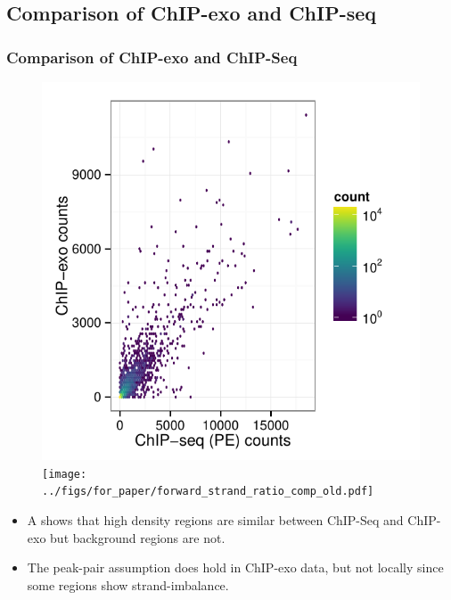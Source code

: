 \documentclass[compress,table,xcolor=dvipsnames]{beamer}\usepackage[]{graphicx}\usepackage[]{color}
\begin{document}
\subsection{Comparison of ChIP-exo and ChIP-seq}


\begin{frame}
  \frametitle{Comparison of ChIP-exo and ChIP-Seq}

\begin{figure}[H]
  \centering
  \includegraphics[width = .5\textwidth,page = 3 ]{../figs/for_paper/ChIPseqPET_ChIPexo_tagCount_comparison.pdf}
  \texttt{[image: ../figs/for\_paper/forward\_strand\_ratio\_comp\_old.pdf]}
\end{figure}

{\small
\begin{itemize}
\item A shows that high density regions are similar between ChIP-Seq
  and ChIP-exo but background regions are not.
\item The peak-pair assumption does hold in ChIP-exo data, but not
  locally since some regions show strand-imbalance.
\end{itemize}
}

\end{frame}
\end{document}
